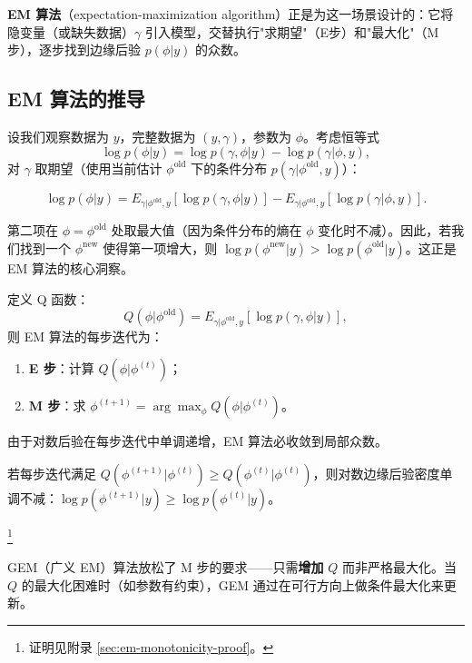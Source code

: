 \textbf{EM 算法}（expectation-maximization algorithm）正是为这一场景设计的：它将隐变量（或缺失数据）$\gamma$ 引入模型，交替执行"求期望"（E步）和"最大化"（M步），逐步找到边缘后验 $p(\phi|y)$ 的众数。

\subsection{EM 算法的推导}\label{sec:em-derivation}

设我们观察数据为 $y$，完整数据为 $(y, \gamma)$，参数为 $\phi$。考虑恒等式
\[
\log p(\phi|y) = \log p(\gamma, \phi|y) - \log p(\gamma|\phi, y),
\]
对 $\gamma$ 取期望（使用当前估计 $\phi^{\text{old}}$ 下的条件分布 $p(\gamma|\phi^{\text{old}}, y)$）：

\[
\log p(\phi|y) = E_{\gamma|\phi^{\text{old}}, y}\!\left[ \log p(\gamma, \phi|y) \right] - E_{\gamma|\phi^{\text{old}}, y}\!\left[ \log p(\gamma|\phi, y) \right].
\label{eq:em-log-identity}
\]

第二项在 $\phi = \phi^{\text{old}}$ 处取最大值（因为条件分布的熵在 $\phi$ 变化时不减）。因此，若我们找到一个 $\phi^{\text{new}}$ 使得第一项增大，则 $\log p(\phi^{\text{new}}|y) > \log p(\phi^{\text{old}}|y)$。这正是 EM 算法的核心洞察。

定义 Q 函数：
\[
Q(\phi|\phi^{\text{old}}) = E_{\gamma|\phi^{\text{old}}, y}\!\left[ \log p(\gamma, \phi|y) \right],
\]
则 EM 算法的每步迭代为：
\begin{enumerate}
\item \textbf{E 步}：计算 $Q(\phi|\phi^{(t)})$；
\item \textbf{M 步}：求 $\phi^{(t+1)} = \arg\max_\phi Q(\phi|\phi^{(t)})$。
\end{enumerate}

由于对数后验在每步迭代中单调递增，EM 算法必收敛到局部众数。

\begin{Theorem}[EM 算法的单调性]
若每步迭代满足 $Q(\phi^{(t+1)}|\phi^{(t)}) \geq Q(\phi^{(t)}|\phi^{(t)})$，则对数边缘后验密度单调不减：$\log p(\phi^{(t+1)}|y) \geq \log p(\phi^{(t)}|y)$。
\end{Theorem}\footnote{证明见附录 \cref{sec:em-monotonicity-proof}。}

GEM（广义 EM）算法放松了 M 步的要求——只需\textbf{增加} $Q$ 而非严格最大化。当 $Q$ 的最大化困难时（如参数有约束），GEM 通过在可行方向上做条件最大化来更新。

